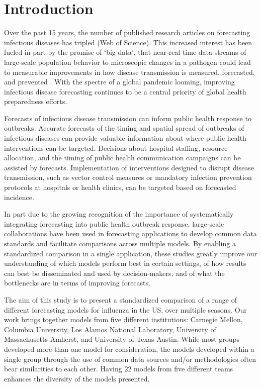 \documentclass{article}
\begin{document}
\section{Introduction}

Over the past 15 years, the number of published research articles on forecasting infectious diseases has tripled (Web of Science). 
This increased interest has been fueled in part by the promise of `big data', that near real-time data streams of large-scale population behavior \cite{Molodecky2017} to microscopic changes in a pathogen \cite{Du2017} could lead to measurable improvements in how disease transmission is measured, forecasted, and prevented \cite{Bansal2016}. 
With the spectre of a global pandemic looming, improving infectious disease forecasting continues to be a central priority of global health preparedness efforts.\cite{Myers2000,WorldHealthOrganization2016,Chretien2015}

Forecasts of infectious disease transmission can inform public health response to outbreaks. 
Accurate forecasts of the timing and spatial spread of outbreaks of infectious diseases can provide valuable information about where public health interventions can be targeted.\cite{Lipsitch2011}
Decisions about hospital staffing, resource allocation, and the timing of public health communication campaigns can be assisted by forecasts. 
Implementation of interventions designed to disrupt disease transmission, such as vector control measures or mandatory infection prevention protocols at hospitals or health clinics, can be targeted based on forecasted incidence.

In part due to the growing recognition of the importance of systematically integrating forecasting into public health outbreak response, large-scale collaborations have been used in forecasting applications to develop common data standards and facilitate comparisons across multiple models.\cite{Biggerstaff2016,Smith2017,Biggerstaff2018,Viboud2017}
By enabling a standardized comparison in a single application, these studies greatly improve our understanding of which models perform best in certain settings, of how results can best be disseminated and used by decision-makers, and of what the bottlenecks are in terms of improving forecasts.

The aim of this study is to present a standardized comparison of a range of different forecasting models for influenza in the US, over multiple seasons.
Our work brings together models from five different institutions: Carnegie Mellon, Columbia University, Los Alamos National Laboratory, University of Massachusetts-Amherst, and University of Texas-Austin.
While most groups developed more than one model for consideration, the models developed within a single group through the use of common data sources and/or methodologies often bear similarities to each other.
Having 22 models from five different teams enhances the diversity of the models presented.
\end{document}
